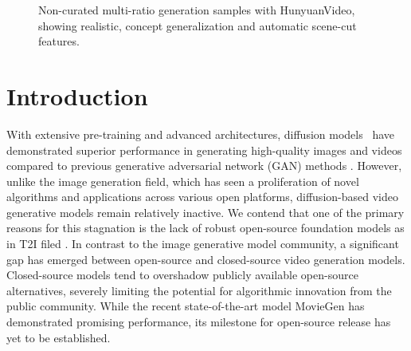 \documentclass{article}
\newcommand{\nameofmethod}{HunyuanVideo}
\begin{document}
\begin{figure}[!h]
\vspace{-0.5cm}
    \centering
    \begin{minipage}[b]{0.3\textwidth}
        \centering
    \end{minipage}%
    \hspace{0.01\textwidth} 
    \begin{minipage}[b]{0.5\textwidth}
        \centering
        \begin{minipage}[b]{0.48\textwidth}
            \centering
        \end{minipage}%
        \hspace{0.01\textwidth} %
        \begin{minipage}[b]{0.48\textwidth}
            \centering

        \end{minipage}

        \vspace{0.01\textwidth} 

    \end{minipage}
    \caption{Non-curated multi-ratio generation samples with \nameofmethod{}, showing realistic, concept generalization and automatic scene-cut features.}
\end{figure}

\section{Introduction}
\label{sec:intro}

With extensive pre-training and advanced architectures, diffusion models~\cite{li2024hunyuandit,peebles2023scalable,esser2024scaling,rombach2022high,blattmann2023stable,girdhar2023emu,polyak2024movie,FLUX} have demonstrated superior performance in generating high-quality images and videos compared to previous generative adversarial network (GAN) methods \citep{brock2018large}.
However, unlike the image generation field, which has seen a proliferation of novel algorithms and applications across various open platforms, diffusion-based video generative models remain relatively inactive. We contend that one of the primary reasons for this stagnation is the lack of robust open-source foundation models as in T2I filed \cite{FLUX}. In contrast to the image generative model community, a significant gap has emerged between open-source and closed-source video generation models. Closed-source models tend to overshadow publicly available open-source alternatives, severely limiting the potential for algorithmic innovation from the public community. While the recent state-of-the-art model MovieGen \cite{polyak2024movie} has demonstrated promising performance, its milestone for open-source release has yet to be established.
\end{document}
